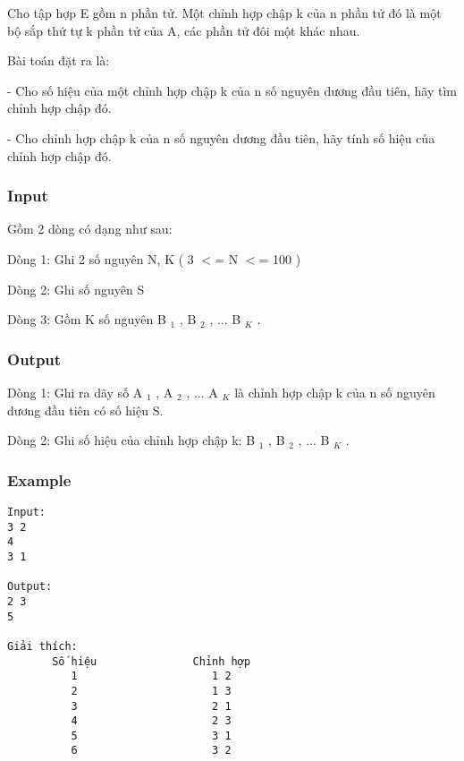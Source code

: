 



   Cho tập hợp E gồm n phần tử. Một chỉnh hợp chập k  của n phần tử đó là một bộ sắp thứ tự k phần tử của A, các phần tử đôi một khác nhau.  

   Bài toán đặt ra là:  

   - Cho số hiệu của một chỉnh hợp chập k của n số nguyên dương đầu tiên, hãy tìm chỉnh hợp chập đó.  

   - Cho chỉnh hợp chập k của n số nguyên dương đầu tiên, hãy tính số hiệu của chỉnh hợp chập đó.  

\subsubsection{   Input  }

   Gồm 2 dòng có dạng như sau:  

   Dòng 1: Ghi 2 số nguyên N, K ( 3 $<$= N $<$= 100 )  

   Dòng 2: Ghi số nguyên S  

   Dòng 3: Gồm K số nguyên B   $_    1   $   , B   $_    2   $   , ... B   $_    K   $   .  

\subsubsection{   Output  }

   Dòng 1: Ghi ra dãy số A   $_    1   $   , A   $_    2   $   , ... A   $_    K   $   là chỉnh hợp chập k của n số nguyên dương đầu tiên có số hiệu S.  

   Dòng 2: Ghi số hiệu của chỉnh hợp chập k: B   $_    1   $   , B   $_    2   $   , ... B   $_    K   $   .  

\subsubsection{   Example  }
\begin{verbatim}
Input:
3 2 
4
3 1

Output:
2 3
5

Giải thích:
       Số hiệu               Chỉnh hợp
          1                     1 2
          2                     1 3
          3                     2 1
          4                     2 3
          5                     3 1
          6                     3 2

\end{verbatim}